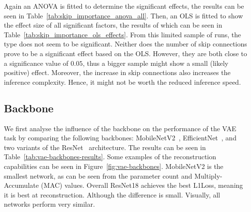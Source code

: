 Again an ANOVA is fitted to determine the significant effects, the results can be seen in Table~\ref{tab:skip_importance_anova_all}. 
Then, an OLS is fitted to show the effect size of all significant factors, the results of which can be seen in Table~\ref{tab:skip_importance_ols_effects}. From this limited sample of runs, the type does not seem to be significant. Neither does the number of skip connections prove to be a significant effect based on the OLS. However, they are both close to a significance value of $0.05$, thus a bigger sample might show a small (likely positive) effect. Moreover, the increase in skip connections also increases the inference complexity. Hence, it might not be worth the reduced inference speed.




\subsection{Backbone}
We first analyse the influence of the backbone on the performance of the VAE task by comparing the following backbones: MobileNetV2~\cite{sandler2019mobilenetv2invertedresidualslinear}, EfficientNet~\cite{tan2020efficientnetrethinkingmodelscaling}, and two variants of the ResNet~\cite{he2015deep} architecture. The results can be seen in Table~\ref{tab:vae-backbones-results}. Some examples of the reconstruction capabilities can be seen in Figure~\ref{fig:vae-backbones}. MobileNetV2 is the smallest network, as can be seen from the parameter count and Multiply-Accumulate (MAC) values. Overall ResNet18 achieves the best L1Loss, meaning it is best at reconstruction. Although the difference is small. Visually, all networks perform very similar.

